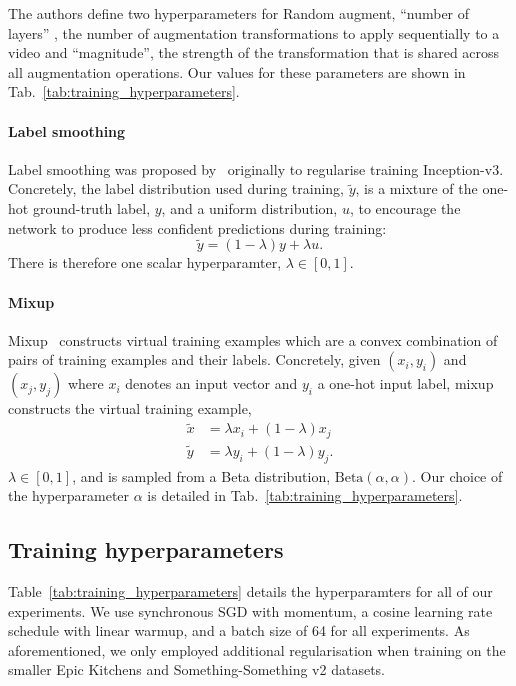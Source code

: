The authors define two hyperparameters for Random augment, ``number of layers'' , the number of augmentation transformations to apply sequentially to a video and ``magnitude'',  the strength of the transformation that is shared across all augmentation operations.
Our values for these parameters are shown in Tab.~\ref{tab:training_hyperparameters}.

\paragraph{Label smoothing}
Label smoothing was proposed by~\cite{szegedy_cvpr_2016} originally to regularise training Inception-v3.
Concretely, the label distribution used during training, $\tilde{y}$, is a mixture of the one-hot ground-truth label, $y$,  and a uniform distribution, $u$, to encourage the network to produce less confident predictions during training:
\begin{equation}
\tilde{y} = (1 - \lambda) y + \lambda u.
\end{equation}
There is therefore one scalar hyperparamter, $\lambda \in [0, 1]$.

\paragraph{Mixup}
Mixup~\cite{zhang_mixup_iclr_2018} constructs virtual training examples which are a convex combination of pairs of training examples and their labels.
Concretely, given $(x_i, y_i)$ and $(x_j, y_j)$ where $x_i$ denotes an input vector and $y_i$ a one-hot input label, mixup constructs the virtual training example,
\begin{align}
\tilde{x} &= \lambda x_i + (1 - \lambda) x_j \nonumber \\
\tilde{y} &= \lambda y_i + (1 - \lambda) y_j.
\end{align}
$\lambda \in [0, 1]$, and is sampled from a Beta distribution, $\text{Beta}(\alpha, \alpha)$.
Our choice of the hyperparameter $\alpha$ is detailed in Tab.~\ref{tab:training_hyperparameters}.


\subsection{Training hyperparameters}
\label{sec:hyperparameters}

Table~\ref{tab:training_hyperparameters} details the hyperparamters for all of our experiments.
We use synchronous SGD with momentum, a cosine learning rate schedule with linear warmup, and a batch size of 64 for all experiments.
As aforementioned, we only employed additional regularisation when training on the smaller Epic Kitchens and Something-Something v2 datasets.